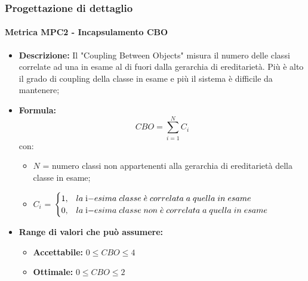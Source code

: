 \subsubsection{Progettazione di dettaglio}
    \paragraph{Metrica MPC2 - Incapsulamento CBO}
    \begin{itemize}
        \item \textbf{Descrizione:} Il "Coupling Between Objects" misura il numero delle classi correlate ad una in esame al di fuori dalla gerarchia di ereditarietà. Più è alto il grado di coupling della classe in esame e più il sistema è difficile da mantenere;
        \item \textbf{Formula:} $$CBO = {\sum_{i=1}^{N} C_i}$$
        con:
        \begin{itemize}
            \item $N$ = numero classi non appartenenti alla gerarchia di ereditarietà della classe in esame;
            \item $C_i$ =
            \begin{math} {
                \begin{cases}
                    1, & la \; $i$-esima \; classe \; \grave{e} \; correlata \; a \; quella \; in \; esame \\
                    0, & la \; $i$-esima \; classe \; non \; \grave{e} \; correlata \; a \; quella \; in \; esame
                \end{cases}
            }
            \end{math}
        \end{itemize}
        \item \textbf{Range di valori che può assumere:}
        \begin{itemize}
            \item \textbf{Accettabile:} $0 \leq{} CBO \leq 4$
            \item \textbf{Ottimale:} $0 \leq{} CBO \leq 2$
        \end{itemize}
    \end{itemize}

